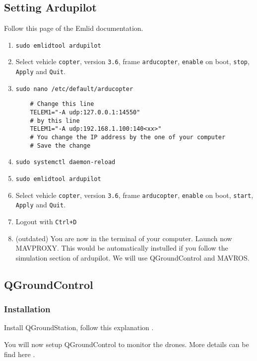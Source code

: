 \subsection{Setting Ardupilot}
Follow this page \cite{emlid_ardupilot_installation} of the Emlid documentation.

\begin{enumerate}
    \item \texttt{sudo emlidtool ardupilot}
    \item Select vehicle \texttt{copter}, version \texttt{3.6}, frame \texttt{arducopter}, \texttt{enable} on boot, \texttt{stop}, \texttt{Apply} and \texttt{Quit}.
    \item \texttt{sudo nano /etc/default/arducopter}


          \begin{verbatim}
    # Change this line
    TELEM1="-A udp:127.0.0.1:14550"
    # by this line
    TELEM1="-A udp:192.168.1.100:140<xx>"
    # You change the IP address by the one of your computer
    # Save the change
                \end{verbatim}


    \item \texttt{sudo systemctl daemon-reload}
    \item \texttt{sudo emlidtool ardupilot}
    \item Select vehicle \texttt{copter}, version \texttt{3.6}, frame \texttt{arducopter}, \texttt{enable} on boot, \texttt{start}, \texttt{Apply} and \texttt{Quit}.
    \item Logout with \texttt{Ctrl+D}
    \item (outdated) You are now in the terminal of your computer. Launch now MAVPROXY. This would be automatically instulled if you follow the simulation section of ardupilot. We will use QGroundControl and MAVROS.
\end{enumerate}

\subsection{QGroundControl}
\subsubsection{Installation}
Install QGroundStation, follow this explanation \cite{qgc_install}.

You will now setup QGroundControl to monitor the drones. More details can be find here \cite{qgc_setup}.

